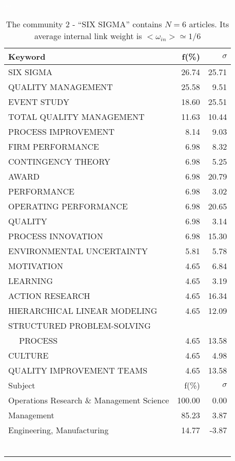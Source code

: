 \documentclass[a4paper,11pt]{report}
\begin{document}
\begin{landscape}
\clearpage

\begin{table}[!ht]
\caption{The community 2 - ``SIX SIGMA'' contains $N = 6$ articles. Its average internal link weight is $<\omega_{in}> \simeq 1/6$ }
\textcolor{white}{aa}\\
{\scriptsize\begin{tabular}{|l r r|}
\hline
Keyword & f(\%) & $\sigma$\\
\hline
SIX SIGMA & 26.74 & 25.71\\
QUALITY MANAGEMENT & 25.58 & 9.51\\
EVENT STUDY & 18.60 & 25.51\\
TOTAL QUALITY MANAGEMENT & 11.63 & 10.44\\
PROCESS IMPROVEMENT & 8.14 & 9.03\\
FIRM PERFORMANCE & 6.98 & 8.32\\
CONTINGENCY THEORY & 6.98 & 5.25\\
AWARD & 6.98 & 20.79\\
PERFORMANCE & 6.98 & 3.02\\
OPERATING PERFORMANCE & 6.98 & 20.65\\
QUALITY & 6.98 & 3.14\\
PROCESS INNOVATION & 6.98 & 15.30\\
ENVIRONMENTAL UNCERTAINTY & 5.81 & 5.78\\
MOTIVATION & 4.65 & 6.84\\
LEARNING & 4.65 & 3.19\\
ACTION RESEARCH & 4.65 & 16.34\\
HIERARCHICAL LINEAR MODELING & 4.65 & 12.09\\
STRUCTURED PROBLEM-SOLVING &  & \\
$\quad$ PROCESS & 4.65 & 13.58\\
CULTURE & 4.65 & 4.98\\
QUALITY IMPROVEMENT TEAMS & 4.65 & 13.58\\
\hline
\hline
Subject & f(\%) & $\sigma$\\
\hline
Operations Research \& Management Science & 100.00 & 0.00\\
Management & 85.23 & 3.87\\
Engineering, Manufacturing & 14.77 & -3.87\\
 &  & \\
 &  & \\
 &  & \\
 &  & \\
 &  & \\
 &  & \\

\end{tabular}}
\end{table}
\end{landscape}
\end{document}
